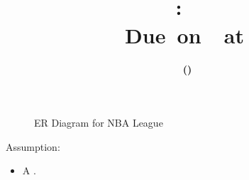 \documentclass[12pt,letterpaper,titlepage,en-US]{article}
\title{
    \vspace{2in}
    \textmd{\textbf{\hmwkClassName \\\hmwkClass:\ \hmwkTitle}}\\
    \normalsize\vspace{0.1in}\small{Due\ on\ \DTMusedate{DueDate}\ at \DTMusetime{DueDate} }\\
    \vspace{0.1in}\large{\textit{\hmwkClassInstructor}}
    \vspace{3in}
}
\author{\textbf{\hmwkAuthorName\ \footnotesize{(\hmwkAuthorNetID)}} \\ \hmwkAuthorUTDEmail}
\date{}
\begin{document}
\maketitle


\pagebreak

\begin{homeworkProblem}

\begin{figure}[!htb]
  \caption{ER Diagram for NBA League}
  \label{fig:tikz:nba}
\end{figure}

Assumption:

\begin{itemize}
    \item A .
\end{itemize}

\end{homeworkProblem}
\end{document}
